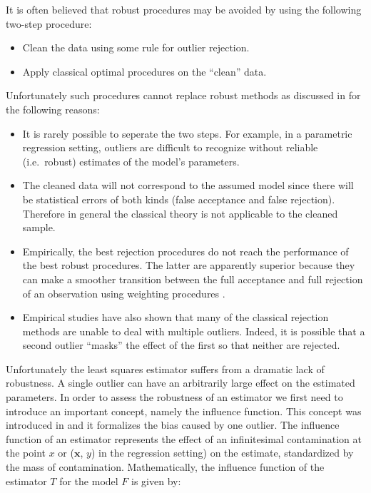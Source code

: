 \documentclass[]{book}
\providecommand{\tightlist}{%
  \setlength{\itemsep}{0pt}\setlength{\parskip}{0pt}}
\theoremstyle{definition}
\theoremstyle{definition}
\theoremstyle{definition}
\theoremstyle{remark}
\begin{document}
{It is often believed that robust procedures may be avoided by using the
following two-step procedure:

\begin{itemize}
\tightlist
\item
  Clean the data using some rule for outlier rejection.
\item
  Apply classical optimal procedures on the ``clean'' data.
\end{itemize}

Unfortunately such procedures cannot replace robust methods as discussed
in \citet{huber2009robust} for the following reasons:

\begin{itemize}
\tightlist
\item
  It is rarely possible to seperate the two steps. For example, in a
  parametric regression setting, outliers are difficult to recognize
  without reliable (i.e.~robust) estimates of the model's parameters.
\item
  The cleaned data will not correspond to the assumed model since there
  will be statistical errors of both kinds (false acceptance and false
  rejection). Therefore in general the classical theory is not
  applicable to the cleaned sample.
\item
  Empirically, the best rejection procedures do not reach the
  performance of the best robust procedures. The latter are apparently
  superior because they can make a smoother transition between the full
  acceptance and full rejection of an observation using weighting
  procedures \citet{hampel1987robust}.
\item
  Empirical studies have also shown that many of the classical rejection
  methods are unable to deal with multiple outliers. Indeed, it is
  possible that a second outlier ``masks'' the effect of the first so
  that neither are rejected.
\end{itemize}

Unfortunately the least squares estimator suffers from a dramatic lack
of robustness. A single outlier can have an arbitrarily large effect on
the estimated parameters. In order to assess the robustness of an
estimator we first need to introduce an important concept, namely the
influence function. This concept was introduced in
\citet{hampel1968contributions} and it formalizes the bias caused by one
outlier. The influence function of an estimator represents the effect of
an infinitesimal contamination at the point \(x\) or (\(\mathbf{x}\),
\(y\)) in the regression setting) on the estimate, standardized by the
mass of contamination. Mathematically, the influence function of the
estimator \(T\) for the model \(F\) is given by:

}
\end{document}
